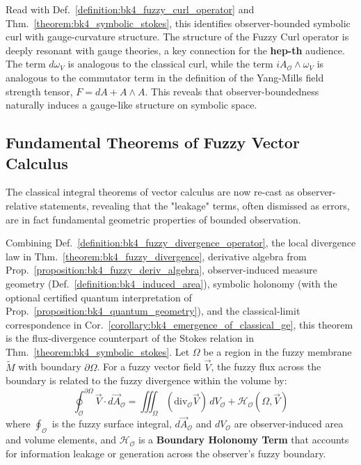 \begin{scholium}
\label{scholium:bk4_gauge_relation}
Read with Def.~\ref{definition:bk4_fuzzy_curl_operator} and Thm.~\ref{theorem:bk4_symbolic_stokes}, this identifies observer-bounded symbolic curl with gauge-curvature structure.
The structure of the Fuzzy Curl operator is deeply resonant with gauge theories, a key connection for the \textbf{hep-th} audience. The term $d\omega_V$ is analogous to the classical curl, while the term $i A_{\mathcal{O}} \wedge \omega_V$ is analogous to the commutator term in the definition of the Yang-Mills field strength tensor, $F = dA + A \wedge A$. This reveals that observer-boundedness naturally induces a gauge-like structure on symbolic space.
\end{scholium}

\subsection{Fundamental Theorems of Fuzzy Vector Calculus}
\label{subsec:bk4_fuzzy_vector_calculus_theorems}

The classical integral theorems of vector calculus are now re-cast as observer-relative statements, revealing that the "leakage" terms, often dismissed as errors, are in fact fundamental geometric properties of bounded observation.

\begin{theorem}
\label{theorem:bk4_fuzzy_divergence_theorem}
Combining Def.~\ref{definition:bk4_fuzzy_divergence_operator}, the local divergence law in Thm.~\ref{theorem:bk4_fuzzy_divergence}, derivative algebra from Prop.~\ref{proposition:bk4_fuzzy_deriv_algebra}, observer-induced measure geometry (Def.~\ref{definition:bk4_induced_area}), symbolic holonomy (with the optional certified quantum interpretation of Prop.~\ref{proposition:bk4_quantum_geometry}), and the classical-limit correspondence in Cor.~\ref{corollary:bk4_emergence_of_classical_ge}, this theorem is the flux-divergence counterpart of the Stokes relation in Thm.~\ref{theorem:bk4_symbolic_stokes}.
Let $\Omega$ be a region in the fuzzy membrane $\tilde{M}$ with boundary $\partial\Omega$. For a fuzzy vector field $\vec{V}$, the fuzzy flux across the boundary is related to the fuzzy divergence within the volume by:
\[
\oint_{\mathcal{O}}^{\partial\Omega} \vec{V} \cdot d\vec{A}_{\mathcal{O}} = \iiint_{\Omega} (\text{div}_{\mathcal{O}} \vec{V}) \, dV_{\mathcal{O}} + \mathcal{H}_{\mathcal{O}}(\Omega, \vec{V})
\]
where $\oint_{\mathcal{O}}$ is the fuzzy surface integral, $d\vec{A}_{\mathcal{O}}$ and $dV_{\mathcal{O}}$ are observer-induced area and volume elements, and $\mathcal{H}_{\mathcal{O}}$ is a \textbf{Boundary Holonomy Term} that accounts for information leakage or generation across the observer's fuzzy boundary.
\end{theorem}

